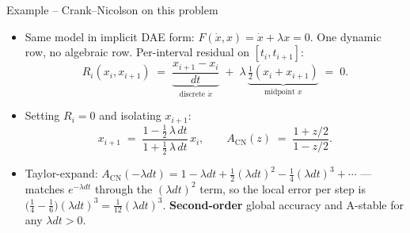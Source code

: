 \documentclass[11pt,aspectratio=169]{beamer}
\begin{document}
\begin{frame}{Example -- Crank--Nicolson on this problem}

\begin{itemize}

\item Same model in implicit DAE form: $F(\dot x, x) = \dot x +
  \lambda x = 0$. One dynamic row, no algebraic row. Per-interval
  residual on $[t_i, t_{i+1}]$:
  \[
  R_i(x_i,x_{i+1})
  \;=\;
  \underbrace{\frac{x_{i+1}-x_i}{dt}}_{\text{discrete }\dot x}
  \;+\;
  \lambda\,\underbrace{\tfrac12(x_i+x_{i+1})}_{\text{midpoint }x}
  \;=\; 0.
  \]

\item Setting $R_i = 0$ and isolating $x_{i+1}$:
  \[
  \boxed{\;
  x_{i+1} \;=\; \frac{1 - \tfrac12\,\lambda\, dt}{1 + \tfrac12\,\lambda\, dt}\,x_i,
  \qquad
  A_{\mathrm{CN}}(z) \;=\; \frac{1+z/2}{1-z/2}.
  \;}
  \]

\item Taylor-expand: $A_{\mathrm{CN}}(-\lambda dt) = 1 - \lambda dt +
  \tfrac12(\lambda dt)^2 - \tfrac14(\lambda dt)^3 + \cdots$ — matches
  $e^{-\lambda dt}$ through the $(\lambda dt)^2$ term, so the local
  error per step is $\bigl(\tfrac14 - \tfrac16\bigr)(\lambda dt)^3 =
  \tfrac{1}{12}(\lambda dt)^3$. \textbf{Second-order} global accuracy
  and A-stable for any $\lambda dt > 0$.

\end{itemize}

\end{frame}
\end{document}
